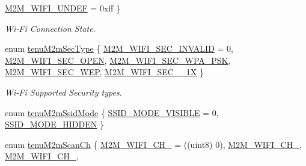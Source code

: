 \begin{DoxyCompactItemize}
\hyperlink{group__WlanEnums_gga460c311f58f4c40c3d20eec9e99db586a293d56dfae465cd602778ff3a7f684b4}{M2\+M\+\_\+\+W\+I\+F\+I\+\_\+\+U\+N\+D\+EF} = 0xff
 \}\begin{DoxyCompactList}\small\item\em Wi-\/\+Fi Connection State. \end{DoxyCompactList}
\item 
enum \hyperlink{group__WlanEnums_gaa232a09c953ec8200c13774f94107b05}{tenu\+M2m\+Sec\+Type} \{ \newline
\hyperlink{group__WlanEnums_ggaa232a09c953ec8200c13774f94107b05acc7f909c52688e49578009b53d61205e}{M2\+M\+\_\+\+W\+I\+F\+I\+\_\+\+S\+E\+C\+\_\+\+I\+N\+V\+A\+L\+ID} = 0, 
\hyperlink{group__WlanEnums_ggaa232a09c953ec8200c13774f94107b05a81b513753be791c13b73d0b2d3639b69}{M2\+M\+\_\+\+W\+I\+F\+I\+\_\+\+S\+E\+C\+\_\+\+O\+P\+EN}, 
\hyperlink{group__WlanEnums_ggaa232a09c953ec8200c13774f94107b05a951d0504fc8e173e60df8ee871f16697}{M2\+M\+\_\+\+W\+I\+F\+I\+\_\+\+S\+E\+C\+\_\+\+W\+P\+A\+\_\+\+P\+SK}, 
\hyperlink{group__WlanEnums_ggaa232a09c953ec8200c13774f94107b05a0bb64825e9635113bbab91934b214780}{M2\+M\+\_\+\+W\+I\+F\+I\+\_\+\+S\+E\+C\+\_\+\+W\+EP}, 
\newline
\hyperlink{group__WlanEnums_ggaa232a09c953ec8200c13774f94107b05a0fcff26361d2f1e5378abf20e51913b5}{M2\+M\+\_\+\+W\+I\+F\+I\+\_\+\+S\+E\+C\+\_\+\_\+1X}
 \}\begin{DoxyCompactList}\small\item\em Wi-\/\+Fi Supported Security types. \end{DoxyCompactList}
\item 
enum \hyperlink{group__WlanEnums_gaa6553caf0dcdd1d8b908ec2383d86a60}{tenu\+M2m\+Ssid\+Mode} \{ \hyperlink{group__WlanEnums_ggaa6553caf0dcdd1d8b908ec2383d86a60aec7509796a7b9fc2ecf2cb85d669f408}{S\+S\+I\+D\+\_\+\+M\+O\+D\+E\+\_\+\+V\+I\+S\+I\+B\+LE} = 0, 
\hyperlink{group__WlanEnums_ggaa6553caf0dcdd1d8b908ec2383d86a60a5a0d2672a8a6631497a36e4d936636e4}{S\+S\+I\+D\+\_\+\+M\+O\+D\+E\+\_\+\+H\+I\+D\+D\+EN}
 \}
\item 
enum \hyperlink{group__WlanEnums_ga2a91dd671e2672dba1a7ed45230f3a99}{tenu\+M2m\+Scan\+Ch} \{ \newline
\hyperlink{group__WlanEnums_gga2a91dd671e2672dba1a7ed45230f3a99a1af3aecfb8fb74254076d723c1e1dd58}{M2\+M\+\_\+\+W\+I\+F\+I\+\_\+\+C\+H\+\_} = ((uint8) 0), 
\hyperlink{group__WlanEnums_gga2a91dd671e2672dba1a7ed45230f3a99a7f33fc7e3835e139ea5f8e715c8d6173}{M2\+M\+\_\+\+W\+I\+F\+I\+\_\+\+C\+H\+\_}, 
\hyperlink{group__WlanEnums_gga2a91dd671e2672dba1a7ed45230f3a99a169eadb09f407ffadbd5a554f7528847}{M2\+M\+\_\+\+W\+I\+F\+I\+\_\+\+C\+H\+\_}, 

\end{DoxyCompactItemize}

